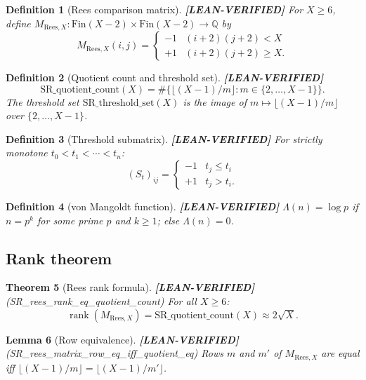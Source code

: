 \documentclass[11pt]{article}
\newtheorem{theorem}{Theorem}[section]
\newtheorem{lemma}[theorem]{Lemma}
\newtheorem{definition}[theorem]{Definition}
\theoremstyle{remark}
\newcommand{\LEANVERIFIED}{\textbf{\color{green!60!black}[LEAN-VERIFIED]}}
\begin{document}
\begin{definition}[Rees comparison matrix] \LEANVERIFIED{}
For $X \geq 6$, define $M_{\mathrm{Rees},X} : \mathrm{Fin}(X-2) \times \mathrm{Fin}(X-2) \to \mathbb{Q}$ by
\[
M_{\mathrm{Rees},X}(i,j) = \begin{cases} -1 & (i+2)(j+2) < X \\ +1 & (i+2)(j+2) \geq X. \end{cases}
\]
\end{definition}

\begin{definition}[Quotient count and threshold set] \LEANVERIFIED{}
\[
\mathrm{SR\_quotient\_count}(X) = \#\bigl\{\lfloor(X-1)/m\rfloor : m \in \{2,\ldots,X-1\}\bigr\}.
\]
The threshold set $\mathrm{SR\_threshold\_set}(X)$ is the image of $m \mapsto \lfloor(X-1)/m\rfloor$
over $\{2,\ldots,X-1\}$.
\end{definition}

\begin{definition}[Threshold submatrix] \LEANVERIFIED{}
For strictly monotone $t_0 < t_1 < \cdots < t_n$:
\[
(S_t)_{ij} = \begin{cases} -1 & t_j \leq t_i \\ +1 & t_j > t_i. \end{cases}
\]
\end{definition}

\begin{definition}[von Mangoldt function] \LEANVERIFIED{}
$\Lambda(n) = \log p$ if $n = p^k$ for some prime $p$ and $k \geq 1$; else $\Lambda(n) = 0$.
\end{definition}

\subsection{Rank theorem}

\begin{theorem}[Rees rank formula] \LEANVERIFIED{} \textnormal{(SR\_rees\_rank\_eq\_quotient\_count)}
For all $X \geq 6$:
\[
\operatorname{rank}(M_{\mathrm{Rees},X}) = \mathrm{SR\_quotient\_count}(X) \approx 2\sqrt{X}.
\]
\end{theorem}

\begin{lemma}[Row equivalence] \LEANVERIFIED{} \textnormal{(SR\_rees\_matrix\_row\_eq\_iff\_quotient\_eq)}
Rows $m$ and $m'$ of $M_{\mathrm{Rees},X}$ are equal iff $\lfloor(X-1)/m\rfloor = \lfloor(X-1)/m'\rfloor$.
\end{lemma}
\end{document}

